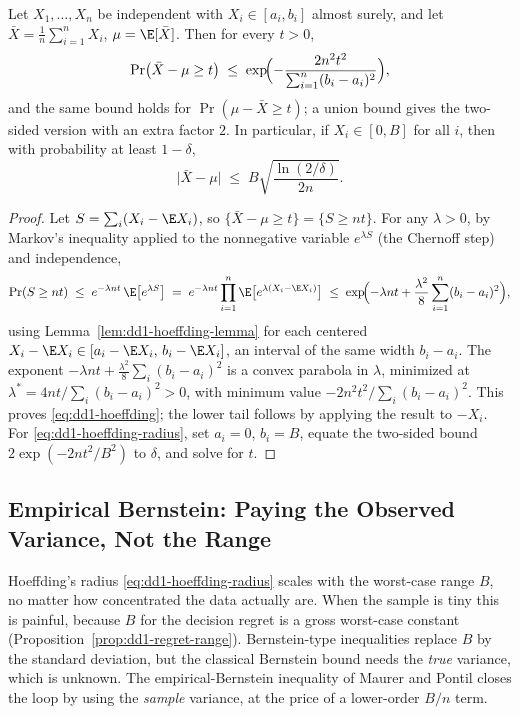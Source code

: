 \begin{theorem}
\label{thm:dd1-hoeffding}
Let $X_1, \dots, X_n$ be independent with $X_i \in [a_i, b_i]$ almost surely,
and let $\bar{X} = \frac{1}{n}\sum_{i=1}^n X_i$, $\mu = \E[\bar{X}]$. Then for
every $t > 0$,
\begin{equation}
\label{eq:dd1-hoeffding}
\Pr\bigl( \bar{X} - \mu \ge t \bigr)
\;\le\; \exp\!\Bigl( - \frac{2 n^2 t^2}{\sum_{i=1}^n (b_i - a_i)^2} \Bigr),
\end{equation}
and the same bound holds for $\Pr(\mu - \bar{X} \ge t)$; a union bound gives
the two-sided version with an extra factor $2$. In particular, if
$X_i \in [0, B]$ for all $i$, then with probability at least $1 - \delta$,
\begin{equation}
\label{eq:dd1-hoeffding-radius}
\bigl| \bar{X} - \mu \bigr| \;\le\; B \sqrt{ \frac{\ln(2/\delta)}{2n} }.
\end{equation}
\end{theorem}

\begin{proof}
Let $S = \sum_i (X_i - \E X_i)$, so $\{\bar{X} - \mu \ge t\} =
\{S \ge nt\}$. For any $\lambda > 0$, by Markov's inequality applied to the
nonnegative variable $e^{\lambda S}$ (the Chernoff step) and independence,
\[
\Pr( S \ge nt ) \;\le\; e^{-\lambda n t}\, \E\bigl[ e^{\lambda S} \bigr]
\;=\; e^{-\lambda n t} \prod_{i=1}^n \E\bigl[ e^{\lambda (X_i - \E X_i)}
\bigr]
\;\le\; \exp\!\Bigl( -\lambda n t + \frac{\lambda^2}{8} \sum_{i=1}^n
(b_i - a_i)^2 \Bigr),
\]
using Lemma~\ref{lem:dd1-hoeffding-lemma} for each centered $X_i - \E X_i \in
[a_i - \E X_i,\, b_i - \E X_i]$, an interval of the same width $b_i - a_i$.
The exponent $-\lambda n t + \frac{\lambda^2}{8}\sum_i (b_i - a_i)^2$ is a
convex parabola in $\lambda$, minimized at
$\lambda^* = 4nt / \sum_i (b_i - a_i)^2 > 0$, with minimum value
$-2 n^2 t^2 / \sum_i (b_i - a_i)^2$. This proves \eqref{eq:dd1-hoeffding};
the lower tail follows by applying the result to $-X_i$. For
\eqref{eq:dd1-hoeffding-radius}, set $a_i = 0$, $b_i = B$, equate the
two-sided bound $2\exp(-2nt^2/B^2)$ to $\delta$, and solve for $t$.
\end{proof}

\subsection{Empirical Bernstein: Paying the Observed Variance, Not the Range}

Hoeffding's radius \eqref{eq:dd1-hoeffding-radius} scales with the worst-case
range $B$, no matter how concentrated the data actually are. When the sample
is tiny this is painful, because $B$ for the decision regret is a gross
worst-case constant (Proposition~\ref{prop:dd1-regret-range}). Bernstein-type
inequalities replace $B$ by the standard deviation, but the classical
Bernstein bound needs the \emph{true} variance, which is unknown. The
empirical-Bernstein inequality of Maurer and Pontil
\cite{maurer2009empirical} closes the loop by using the \emph{sample}
variance, at the price of a lower-order $B/n$ term.

